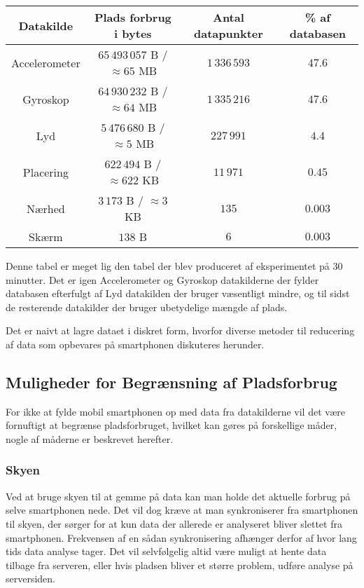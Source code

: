 \begin{tabular}{|c|c|c|c|}
	\hline Datakilde	 & Plads forbrug i bytes	  			& Antal datapunkter 	& \% af databasen \\
	\hline Accelerometer & $65\,493\,057$ B / $\approx65$ MB   	& $1\,336\,593$    		& $47.6$ \\ 
	\hline Gyroskop 	 & $64\,930\,232$ B / $\approx64$ MB  	& $1\,335\,216$   		& $47.6$ \\ 
	\hline Lyd 		  	 & $5\,476\,680$ B / $\approx5$  MB  	& $227\,991$     		& $4.4$ \\ 
	\hline Placering 	 & $622\,494$ B	/ $\approx622$ KB		& $11\,971$      		& $0.45$ \\ 
	\hline Nærhed    	 & $3\,173$ B	/ $\approx3$ KB			& $135$ 				& $0.003$ \\ 
	\hline Skærm 		 & $138$ B          					& $6$          			& $0.003$ \\ 
	\hline 
\end{tabular} 

Denne tabel er meget lig den tabel der blev produceret af eksperimentet på 30 minutter.
Det er igen Accelerometer og Gyroskop datakilderne der fylder databasen efterfulgt af Lyd datakilden der bruger væsentligt mindre, og til sidst de resterende datakilder der bruger ubetydelige mængde af plads.

Det er naivt at lagre dataet i diskret form, hvorfor diverse metoder til reducering af data som opbevares på smartphonen diskuteres herunder.

\subsection{Muligheder for Begrænsning af Pladsforbrug}
For ikke at fylde mobil smartphonen op med data fra datakilderne vil det være fornuftigt at begrænse pladsforbruget, hvilket kan gøres på forskellige måder, nogle af måderne er beskrevet herefter.

\subsubsection{Skyen}
Ved at bruge skyen til at gemme på data kan man holde det aktuelle forbrug på selve smartphonen nede.
Det vil dog kræve at man synkroniserer fra smartphonen til skyen, der sørger for at kun data der allerede er analyseret bliver slettet fra smartphonen. 
Frekvensen af en sådan synkronisering afhænger derfor af hvor lang tids data analyse tager.
Det vil selvfølgelig altid være muligt at hente data tilbage fra serveren, eller hvis pladsen bliver et større problem, udføre analyse på serversiden.

